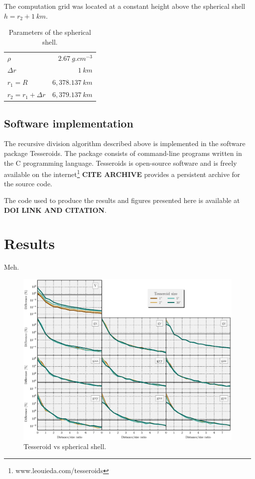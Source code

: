 The computation grid was located at a constant height above the spherical shell
$h = r_2 + 1\ km$.



\begin{table}
    \caption{Parameters of the spherical shell.}
    \label{tab:shell}
    \begin{tabular}{lr}
        $\rho$                    & $2.67\ g.cm^{-3}$ \\
        $\Delta r$                & $1\ km$ \\
        $r_1 = R$                 & $6,378.137\ km$ \\
        $r_2 = r_1 + \Delta r$    & $6,379.137\ km$ \\
    \end{tabular}
\end{table}


\subsection{Software implementation}

The recursive division algorithm described above
is implemented in the software package
Tesseroids.
The package consists
of command-line programs
written in the C programming language.
Tesseroids is open-source software
and is freely available
on the internet\footnote{www.leouieda.com/tesseroids}
\textbf{CITE ARCHIVE} provides a persistent
archive for the source code.

The code used to produce the results and figures presented here
is available at \textbf{DOI LINK AND CITATION}.


\section{Results}

Meh.

\begin{figure}
    \centering
    \includegraphics[width=\textwidth]{figs/tesseroid-x-shell}
    \caption{
        Tesseroid vs spherical shell.
    }
    \label{fig:tesseroid-x-shell}
\end{figure}

